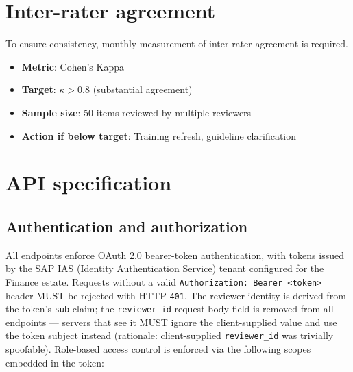 \documentclass[11pt,a4paper,twoside]{report}
\begin{document}
\section{Inter-rater agreement}

To ensure consistency, monthly measurement of inter-rater agreement is required.

\begin{itemize}
\item \textbf{Metric}: Cohen's Kappa
\item \textbf{Target}: $\kappa > 0.8$ (substantial agreement)
\item \textbf{Sample size}: 50 items reviewed by multiple reviewers
\item \textbf{Action if below target}: Training refresh, guideline clarification
\end{itemize}

\section{API specification}

\subsection{Authentication and authorization}
\label{sec:dashboard-api-auth}

All endpoints enforce OAuth 2.0 bearer-token authentication, with
tokens issued by the SAP IAS (Identity Authentication Service)
tenant configured for the Finance estate. Requests without a valid
\texttt{Authorization:\ Bearer <token>} header MUST be rejected
with HTTP \texttt{401}. The reviewer identity is derived from the
token's \texttt{sub} claim; the \texttt{reviewer\_id} request body
field is removed from all endpoints --- servers that see it MUST
ignore the client-supplied value and use the token subject instead
(rationale: client-supplied \texttt{reviewer\_id} was trivially
spoofable). Role-based access control is enforced via the
following scopes embedded in the token:
\end{document}
